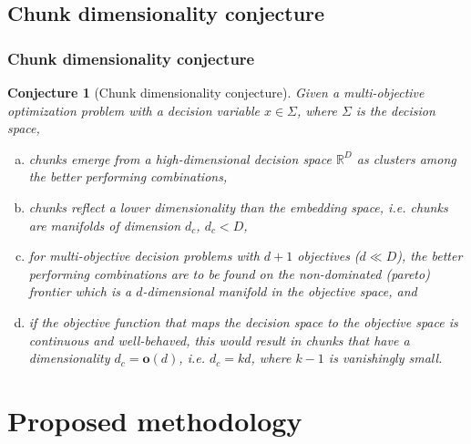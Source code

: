 \documentclass[svgnames, table, smaller]{beamer}
\newtheorem*{conjecture}{Conjecture}
\begin{document}
\subsection{Chunk dimensionality conjecture}

\begin{frame}
  \frametitle{Chunk dimensionality conjecture}
  {\allowdisplaybreaks
    \begin{conjecture}[Chunk dimensionality conjecture]\label{cdconjecture}
      Given a multi-objective optimization problem with a decision variable $x
      \in \Sigma$, where $\Sigma$ is the decision space,
      
      \pause


      \begin{enumerate}[(a)]
      \item chunks emerge from a high-dimensional decision space
        $\mathbb{R}^{D}$ as clusters among the better performing combinations,
        \pause
        
      \item chunks reflect a lower dimensionality than the embedding space,
        i.e.  chunks are manifolds of dimension $d_{c}$, $d_{c} < D$,
        \pause
        
      \item for multi-objective decision problems with $d+1$ objectives ($d
        \ll D$), the better performing combinations are to be found on the
        non-dominated (pareto) frontier which is a $d$-dimensional manifold
        in the objective space, and
        \pause

      \item if the objective function that maps the decision space to the
        objective space is continuous and well-behaved, this would result in
        chunks that have a dimensionality $d_{c} = \textbf{o}(d)$,
        i.e. $d_{c} = kd$, where $k-1$ is vanishingly small.
        
      \end{enumerate}
    \end{conjecture}
  }

\end{frame}

\section{Proposed methodology}
\end{document}
